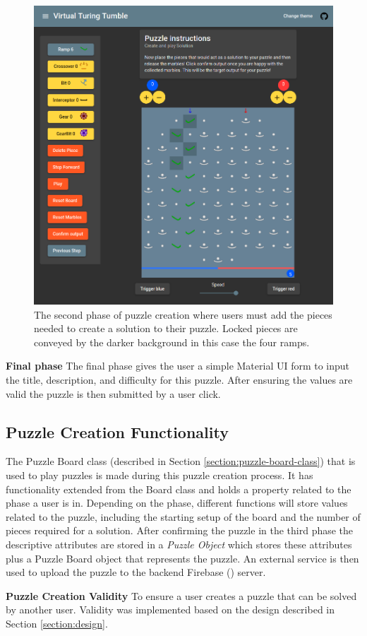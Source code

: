 \documentclass{l4proj}
\begin{document}
\begin{figure}
    \centering
    \includegraphics[width=0.65\linewidth]{images/puzzleCreation.png}
    \caption{The second phase of puzzle creation where users must add the pieces needed to create a solution to their puzzle. Locked pieces are conveyed by the darker background in this case the four ramps.}
    \label{fig:puzzleCreation}
\end{figure}

\textbf{Final phase}
The final phase gives the user a simple Material UI form to input the title, description, and difficulty for this puzzle. After ensuring the values are valid the puzzle is then submitted by a user click.

\subsection{Puzzle Creation Functionality}
\label{section:createPuzzle}
The Puzzle Board class (described in Section \ref{section:puzzle-board-class}) that is used to play puzzles is made during this puzzle creation process. It has functionality extended from the Board class and holds a property related to the phase a user is in. Depending on the phase, different functions will store values related to the puzzle, including the starting setup of the board and the number of pieces required for a solution. After confirming the puzzle in the third phase the descriptive attributes are stored in a \emph{Puzzle Object} which stores these attributes plus a Puzzle Board object that represents the puzzle. An external service is then used to upload the puzzle to the backend Firebase (\cite{firebase}) server.

\textbf{Puzzle Creation Validity}
To ensure a user creates a puzzle that can be solved by another user. Validity was implemented based on the design described in Section \ref{section:design}.
\end{document}
